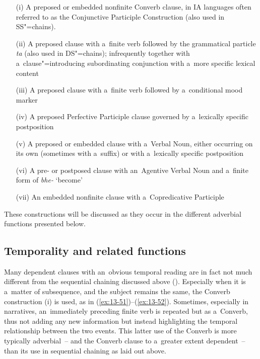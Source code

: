 \begin{enumerate}
\item[(i)] A preposed or embedded nonfinite Converb clause, in IA languages often referred to as the Conjunctive Participle Construction (also used in SS"=chains).

\item[(ii)] A preposed clause with a~finite verb followed by the grammatical particle \textit{ta} (also used in DS"=chains); infrequently together with a~clause"=introducing subordinating conjunction with a~more specific lexical content

\item[(iii)] A preposed clause with a~finite verb followed by a~conditional mood marker

\item[(iv)] A preposed Perfective Participle clause governed by a~lexically specific postposition

\item[(v)] A preposed or embedded clause with a~Verbal Noun, either occurring on its own (sometimes with a~suffix) or with a~lexically specific postposition

\item[(vi)] A pre- or postposed clause with an~Agentive Verbal Noun and a~finite form of \textit{bhe-} `become'

\item[(vii)] An embedded nonfinite clause with a~Copredicative Participle
\end{enumerate}

These constructions will be discussed as they occur in the different adverbial functions presented below. 


\subsection{Temporality and related functions}
\label{subsec:13-4-1}

 Many dependent clauses with an~obvious temporal reading are in fact not much different from the sequential chaining discussed above (). Especially when it is a~matter of subsequence, and the subject remains the same, the Converb construction (i) is used, as in (\ref{ex:13-51})--(\ref{ex:13-52}). Sometimes, especially in narratives, an~immediately preceding finite verb is repeated but as a~Converb, thus not adding any new information but instead highlighting the temporal relationship between the two events. This latter use of the Converb is more typically adverbial~-- and the Converb clause to a~greater extent dependent~-- than its use in sequential chaining as laid out above.

